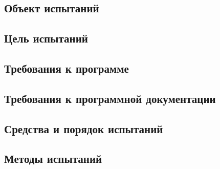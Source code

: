 \subsection{Объект испытаний}

\subsection{Цель испытаний}

\subsection{Требования к программе}

\subsection{Требования к программной документации}

\subsection{Средства и порядок испытаний}

\subsection{Методы испытаний}
